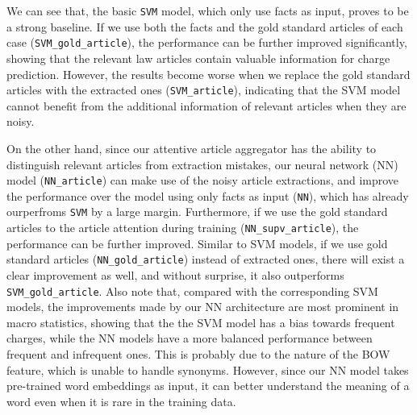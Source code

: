 
We can see that, the basic \texttt{SVM} model, which only use facts as input, proves to be a strong baseline. If we use both the facts and the gold standard articles of each case (\texttt{SVM\_gold\_article}), the performance can be further improved significantly, showing that the relevant law articles contain valuable information for charge prediction. However, the results become worse when we replace the gold standard articles with the extracted ones (\texttt{SVM\_article}), indicating that the SVM model cannot benefit from the additional information of relevant articles when they are noisy. 

On the other hand, since our attentive article aggregator has the ability to distinguish relevant articles from extraction mistakes, our neural network (NN) model (\texttt{NN\_article}) can make use of the noisy article extractions, and improve the performance over the model using only facts as input (\texttt{NN}), which has already ourperfroms \texttt{SVM} by a large margin.
Furthermore, if we use the gold standard articles to  the article attention during training (\texttt{NN\_supv\_article}), the performance can be further improved.
Similar to SVM models, if we use gold standard articles (\texttt{NN\_gold\_article}) instead of extracted ones, there will exist a clear improvement as well, and without surprise, it also outperforms \texttt{SVM\_gold\_article}.
Also note that, compared with the corresponding SVM models, the improvements made by our NN architecture are most prominent in macro statistics, showing that the the SVM model has a  bias towards frequent charges, while the NN models have a more balanced performance between frequent and infrequent ones. This is probably due to the nature of the BOW feature, which is unable to handle synonyms. However, since our NN model takes pre-trained word embeddings as input, it can better understand the meaning of a word even when it is rare in the training data. 


